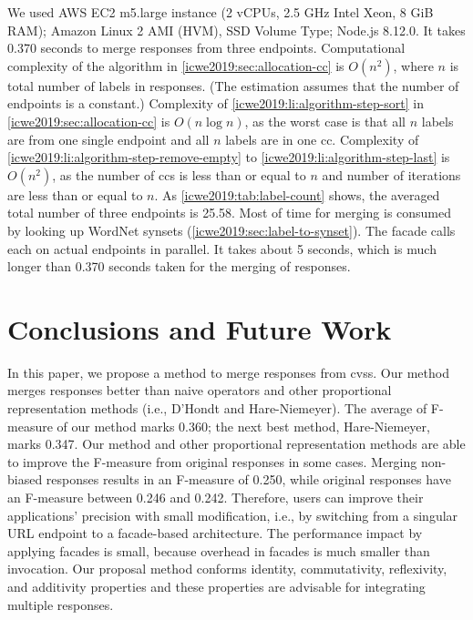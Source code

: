 We used AWS EC2 m5.large instance (2 vCPUs, 2.5 GHz Intel Xeon, 8 GiB RAM); Amazon Linux 2 AMI (HVM), SSD Volume Type; Node.js 8.12.0. It takes 0.370 seconds to merge responses from three endpoints.
Computational complexity of the algorithm in \cref{icwe2019:sec:allocation-cc} is $O(n^2)$, where $n$ is total number of labels in responses.
(The estimation assumes that the number of endpoints is a constant.)
Complexity of \ref{icwe2019:li:algorithm-step-sort} in \cref{icwe2019:sec:allocation-cc} is $O(n \log n)$, as the worst case is that all $n$ labels are from one single endpoint and all $n$ labels are in one \gls{cc}.
Complexity of \ref{icwe2019:li:algorithm-step-remove-empty} to \ref{icwe2019:li:algorithm-step-last} is $O(n^2)$, as the number of \glspl{cc} is less than or equal to $n$ and number of iterations are less than or equal to $n$.
As \cref{icwe2019:tab:label-count} shows, the averaged total number of three endpoints is 25.58.
Most of time for merging is consumed by looking up WordNet synsets (\cref{icwe2019:sec:label-to-synset}). 
The  facade calls each  on actual endpoints in parallel.
It takes about 5 seconds, which is much longer than 0.370 seconds taken for the merging of responses.

\section{Conclusions and Future Work}\label{icwe2019:sec:conclusion}

In this paper, we propose a method to merge responses from \glspl{cvs}.
Our method merges  responses better than naive operators and other proportional representation methods (i.e., D'Hondt and Hare-Niemeyer).
The average of F-measure of our method marks 0.360; the next best method, Hare-Niemeyer, marks 0.347.
Our method and other proportional representation methods are able to improve the F-measure from original responses in some cases.
Merging non-biased responses results in an F-measure of 0.250, while original responses have an F-measure between 0.246 and 0.242.
Therefore, users can improve their applications' precision with small modification, i.e., by switching from a singular URL endpoint to a facade-based architecture.
The performance impact by applying facades is small, because overhead in facades is much smaller than  invocation.
Our proposal method conforms identity, commutativity, reflexivity, and additivity properties and these properties are advisable for integrating multiple responses.

